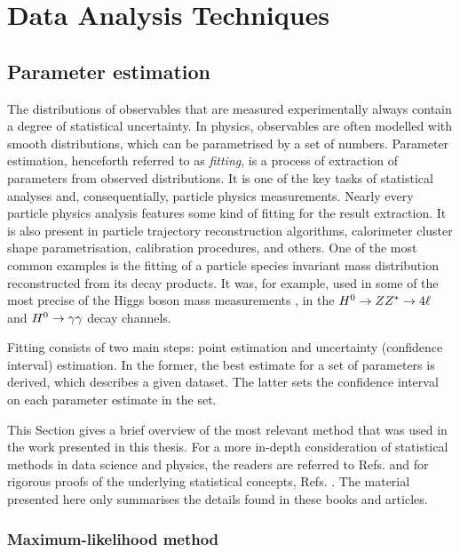 \chapter{Data Analysis Techniques}\label{ch:analysis_techniques}

\section{Parameter estimation}\label{sec:fitting_theory}

The distributions of observables that are measured experimentally always contain a degree of statistical uncertainty.
In physics, observables are often modelled with smooth distributions, which can be parametrised by a set of numbers. 
Parameter estimation, henceforth referred to as \textit{fitting}, is a process of extraction of parameters from observed distributions. 
It is one of the key tasks of statistical analyses and, consequentially, particle physics measurements. 
Nearly every particle physics analysis features some kind of fitting for the result extraction. 
It is also present in particle trajectory reconstruction algorithms, calorimeter cluster shape parametrisation, calibration procedures, and others.
One of the most common examples is the fitting of a particle species invariant mass distribution reconstructed from its decay products.
It was, for example, used in some of the most precise of the Higgs boson mass measurements \cite{ATLAS:2018tdk,CMS:2020xrn}, in the $H^0\rightarrow ZZ^{*}\rightarrow 4\ell$ and $H^0\rightarrow\gamma\gamma$ decay channels.

Fitting consists of two main steps: point estimation and uncertainty (confidence interval) estimation. 
In the former, the best estimate for a set of parameters is derived, which describes a given dataset.
The latter sets the confidence interval on each parameter estimate in the set. 

This Section gives a brief overview of the most relevant method that was used in the work presented in this thesis. 
For a more in-depth consideration of statistical methods in data science and physics, the readers are referred to Refs. \cite{Behnke:2013pga,Blobel_Lohrmann_1998} and for rigorous proofs of the underlying statistical concepts, Refs. \cite{Bohm:2014vmk,James_2006,Barlow:1990vc}. 
The material presented here only summarises the details found in these books and articles.

\subsection{Maximum-likelihood method}\label{sec:mle}

